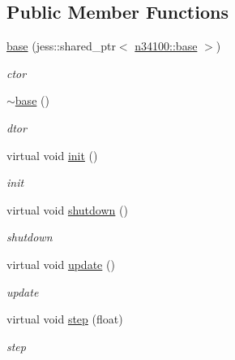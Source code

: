 \subsection*{Public Member Functions}
\begin{DoxyCompactItemize}
\item 
\hyperlink{classnebula_1_1content_1_1actor_1_1physics_1_1base_afd89cccbffae63f75ac2dc601a9a5870}{base} (jess::shared\_\-ptr$<$ \hyperlink{classnebula_1_1content_1_1actor_1_1admin_1_1base}{n34100::base} $>$)
\begin{DoxyCompactList}\small\item\em ctor \item\end{DoxyCompactList}\item 
\hyperlink{classnebula_1_1content_1_1actor_1_1physics_1_1base_ac61d7fb5a9b39875b73a4709d20df23e}{$\sim$base} ()
\begin{DoxyCompactList}\small\item\em dtor \item\end{DoxyCompactList}\item 
virtual void \hyperlink{classnebula_1_1content_1_1actor_1_1physics_1_1base_a606d649258515421027e98aef1f91f7f}{init} ()
\begin{DoxyCompactList}\small\item\em init \item\end{DoxyCompactList}\item 
virtual void \hyperlink{classnebula_1_1content_1_1actor_1_1physics_1_1base_a6de64e1ab1a4e3dd3274bfa722c7aed1}{shutdown} ()
\begin{DoxyCompactList}\small\item\em shutdown \item\end{DoxyCompactList}\item 
virtual void \hyperlink{classnebula_1_1content_1_1actor_1_1physics_1_1base_a468da70c6f6c2520b458662ab97b76e5}{update} ()
\begin{DoxyCompactList}\small\item\em update \item\end{DoxyCompactList}\item 
virtual void \hyperlink{classnebula_1_1content_1_1actor_1_1physics_1_1base_aac025359e301532039709ea8697bb29f}{step} (float)
\begin{DoxyCompactList}\small\item\em step \item\end{DoxyCompactList}\item 

\end{DoxyCompactItemize}
